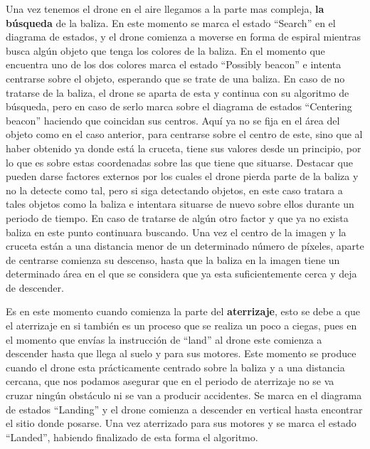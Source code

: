 \hspace{1cm} Una vez tenemos el drone en el aire llegamos a la parte mas compleja, \textbf{la b\'usqueda} de la baliza. En este momento se marca el estado "`Search"' en el diagrama de estados, y el drone comienza a moverse en forma de espiral mientras busca alg\'un objeto que tenga los colores de la baliza. En el momento que encuentra uno de los dos colores marca el estado "`Possibly beacon"' e intenta centrarse sobre el objeto, esperando que se trate de una baliza. En caso de no tratarse de la baliza, el drone se aparta de esta y continua con su algoritmo de b\'usqueda, pero en caso de serlo marca sobre el diagrama de estados "`Centering beacon"' haciendo que coincidan sus centros. Aqu\'i ya no se fija en el \'area del objeto como en el caso anterior, para centrarse sobre el centro de este, sino que al haber obtenido ya donde est\'a la cruceta, tiene sus valores desde un principio, por lo que es sobre estas coordenadas sobre las que tiene que situarse. Destacar que pueden darse factores externos por los cuales el drone pierda parte de la baliza y no la detecte como tal, pero si siga detectando objetos, en este caso tratara a tales objetos como la baliza e intentara situarse de nuevo sobre ellos durante un periodo de tiempo. En caso de tratarse de alg\'un otro factor y que ya no exista baliza en este punto continuara buscando. Una vez el centro de la imagen y la cruceta est\'an a una distancia menor de un determinado n\'umero de p\'ixeles, aparte de centrarse comienza su descenso, hasta que la baliza en la imagen tiene un determinado \'area en el que se considera que ya esta suficientemente cerca y deja de descender. 

\hspace{1cm} Es en este momento cuando comienza la parte del \textbf{aterrizaje}, esto se debe a que el aterrizaje en si tambi\'en es un proceso que se realiza un poco a ciegas, pues en el momento que env\'ias la instrucci\'on de "`land"' al drone este comienza a descender hasta que llega al suelo y para sus motores. Este momento se produce cuando el drone esta pr\'acticamente centrado sobre la baliza y a una distancia cercana, que nos podamos asegurar que en el periodo de aterrizaje no se va cruzar ning\'un obst\'aculo ni se van a producir accidentes. Se marca en el diagrama de estados "`Landing"' y el drone comienza a descender en vertical hasta encontrar el sitio donde posarse. Una vez aterrizado para sus motores y se marca el estado "`Landed"', habiendo finalizado de esta forma el algoritmo. 


